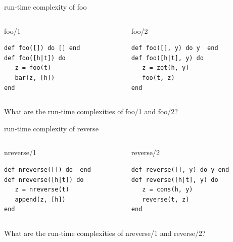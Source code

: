 \begin{frame}[fragile]{run-time complexity of foo}


\pause\vspace{20pt}
\begin{columns}
   \begin{column}{.5\linewidth}
     \begin{block}{foo/1}
       \begin{verbatim}
def foo([]) do [] end
def foo([h|t]) do
   z = foo(t)
   bar(z, [h])
end
       \end{verbatim}
      \end{block}
    \end{column}
\pause
    \begin{column}{.5\linewidth}
     \begin{block}{foo/2}
       \begin{verbatim}
def foo([], y) do y  end
def foo([h|t], y) do
   z = zot(h, y)
   foo(t, z)
end
       \end{verbatim}
      \end{block}
    \end{column}
  \end{columns}

\pause\vspace{20pt}
What are the run-time complexities of foo/1 and foo/2?

\end{frame}


\begin{frame}[fragile]{run-time complexity of reverse}

\pause\vspace{20pt}
\begin{columns}
   \begin{column}{.5\linewidth}
     \begin{block}{nreverse/1}
       \begin{verbatim}
def nreverse([]) do  end
def nreverse([h|t]) do 
   z = nreverse(t)
   append(z, [h])
end
       \end{verbatim}
      \end{block}
    \end{column}
\pause
    \begin{column}{.5\linewidth}
     \begin{block}{reverse/2}
       \begin{verbatim}
def reverse([], y) do y end
def reverse([h|t], y) do 
   z = cons(h, y)
   reverse(t, z)
end
       \end{verbatim}
      \end{block}
    \end{column}
  \end{columns}

\pause\vspace{20pt}
What are the run-time complexities of nreverse/1 and reverse/2?

\end{frame}


